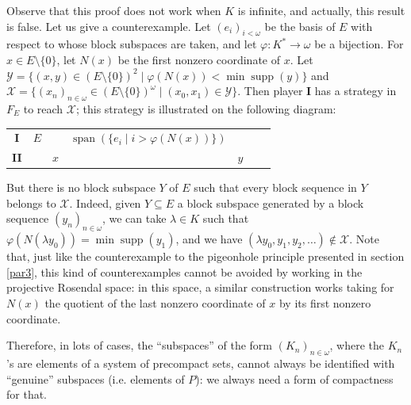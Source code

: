 \documentclass[a4paper,11pt]{article}
\theoremstyle{definition}
\numberwithin{equation}{section}
\newcommand{\X}{\mathcal{X}}
\newcommand{\I}{\textbf{I}}
\DeclareMathOperator{\supp}{supp}
\DeclareMathOperator{\spa}{span}
\begin{document}
Observe that this proof does not work when $K$ is infinite, and actually, this result is false. Let us give a counterexample. Let $(e_i)_{i < \omega}$ be the basis of $E$ with respect to whose block subspaces are taken, and let $\varphi : K^* \rightarrow \omega$ be a bijection. For $x \in E \setminus \{0\}$, let $N(x)$ be the first nonzero coordinate of $x$. Let $\mathcal{Y} = \{(x, y) \in (E\setminus\{0\})^2 \mid \varphi(N(x)) < \min \supp(y)\}$ and $\X = \{(x_n)_{n \in \omega} \in (E\setminus\{0\})^\omega \mid (x_0, x_1) \in \mathcal{Y}\}$. Then player \I{} has a strategy in $F_E$ to reach $\X$; this strategy is illustrated on the following diagram:

\smallskip

\begin{tabular}{ccccccc}
\textbf{I} & $E$ & & $\spa(\{e_i \mid i > \varphi(N(x))\})$ & \\
\textbf{II} & & $x$ & & $y$ 
\end{tabular}

\smallskip

\noindent But there is no block subspace $Y$ of $E$ such that every block sequence in $Y$ belongs to $\X$. Indeed, given $Y \subseteq E$ a block subspace generated by a block sequence $(y_n)_{n \in \omega}$, we can take $\lambda \in K$ such that $\varphi(N(\lambda y_0)) = \min \supp(y_1)$, and we have $(\lambda y_0, y_1, y_2, \ldots) \notin \X$. Note that, just like the counterexample to the pigeonhole principle presented in section \ref{par3}, this kind of counterexamples cannot be avoided by working in the projective Rosendal space:
in this space, a similar construction works taking for $N(x)$ the quotient of the last nonzero coordinate of $x$ by its first nonzero coordinate.

\smallskip

Therefore, in lots of cases, the ``subspaces'' of the form $(K_n)_{n \in \omega}$, where the $K_n$'s are elements of a system of precompact sets, cannot always be identified with ``genuine'' subspaces (i.e. elements of $P$): we always need a form of compactness for that.
\end{document}
